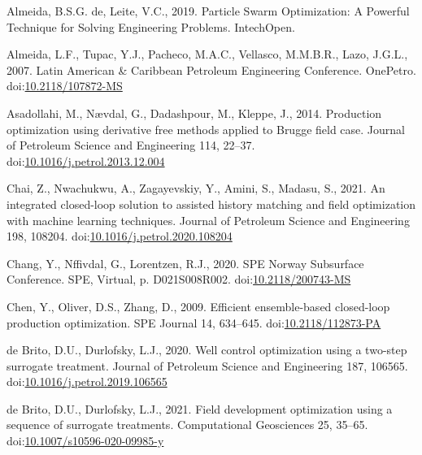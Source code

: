 \documentclass[]{elsarticle} %
\newlength{\cslhangindent}
\newenvironment{CSLReferences}[2] %
 {%
  \setlength{\parindent}{0pt}
  \ifodd #1 \everypar{\setlength{\hangindent}{\cslhangindent}}\ignorespaces\fi
  \ifnum #2 > 0
  \setlength{\parskip}{#2\baselineskip}
  \fi
 }%
 {}
\begin{document}
\hypertarget{refs}{}
\begin{CSLReferences}{1}{0}
\leavevmode{}%
Almeida, B.S.G. de, Leite, V.C., 2019. Particle Swarm Optimization: A Powerful Technique for Solving Engineering Problems. IntechOpen.

\leavevmode{}%
Almeida, L.F., Tupac, Y.J., Pacheco, M.A.C., Vellasco, M.M.B.R., Lazo, J.G.L., 2007. Latin American \& Caribbean Petroleum Engineering Conference. OnePetro. doi:\href{https://doi.org/10.2118/107872-MS}{10.2118/107872-MS}

\leavevmode{}%
Asadollahi, M., Nævdal, G., Dadashpour, M., Kleppe, J., 2014. Production optimization using derivative free methods applied to Brugge field case. Journal of Petroleum Science and Engineering 114, 22--37. doi:\href{https://doi.org/10.1016/j.petrol.2013.12.004}{10.1016/j.petrol.2013.12.004}

\leavevmode{}%
Chai, Z., Nwachukwu, A., Zagayevskiy, Y., Amini, S., Madasu, S., 2021. An integrated closed-loop solution to assisted history matching and field optimization with machine learning techniques. Journal of Petroleum Science and Engineering 198, 108204. doi:\href{https://doi.org/10.1016/j.petrol.2020.108204}{10.1016/j.petrol.2020.108204}

\leavevmode{}%
Chang, Y., Nffivdal, G., Lorentzen, R.J., 2020. SPE Norway Subsurface Conference. SPE, Virtual, p. D021S008R002. doi:\href{https://doi.org/10.2118/200743-MS}{10.2118/200743-MS}

\leavevmode{}%
Chen, Y., Oliver, D.S., Zhang, D., 2009. Efficient ensemble-based closed-loop production optimization. SPE Journal 14, 634--645. doi:\href{https://doi.org/10.2118/112873-PA}{10.2118/112873-PA}

\leavevmode{}%
de Brito, D.U., Durlofsky, L.J., 2020. Well control optimization using a two-step surrogate treatment. Journal of Petroleum Science and Engineering 187, 106565. doi:\href{https://doi.org/10.1016/j.petrol.2019.106565}{10.1016/j.petrol.2019.106565}

\leavevmode{}%
de Brito, D.U., Durlofsky, L.J., 2021. Field development optimization using a sequence of surrogate treatments. Computational Geosciences 25, 35--65. doi:\href{https://doi.org/10.1007/s10596-020-09985-y}{10.1007/s10596-020-09985-y}


\end{CSLReferences}
\end{document}
